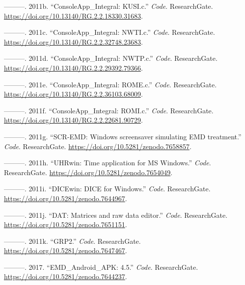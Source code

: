 \documentclass[
]{article}
\newlength{\cslhangindent}
\newlength{\cslentryspacingunit} %
\newenvironment{CSLReferences}[2] %
 {%
  \setlength{\parindent}{0pt}
  \ifodd #1
  \let\oldpar\par
  \def\par{\hangindent=\cslhangindent\oldpar}
  \fi
  \setlength{\parskip}{#2\cslentryspacingunit}
 }%
 {}
\begin{document}
\begin{CSLReferences}{1}{0}
\leavevmode{}%
---------. 2011b. {``{ConsoleApp\_Integral: KUSI.c}.''} \emph{Code}.
ResearchGate. \url{https://doi.org/10.13140/RG.2.2.18330.31683}.

\leavevmode{}%
---------. 2011c. {``{ConsoleApp\_Integral: NWTI.c}.''} \emph{Code}.
ResearchGate. \url{https://doi.org/10.13140/RG.2.2.32748.23683}.

\leavevmode{}%
---------. 2011d. {``{ConsoleApp\_Integral: NWTP.c}.''} \emph{Code}.
ResearchGate. \url{https://doi.org/10.13140/RG.2.2.29392.79366}.

\leavevmode{}%
---------. 2011e. {``{ConsoleApp\_Integral: ROME.c}.''} \emph{Code}.
ResearchGate. \url{https://doi.org/10.13140/RG.2.2.36103.68009}.

\leavevmode{}%
---------. 2011f. {``{ConsoleApp\_Integral: ROMI.c}.''} \emph{Code}.
ResearchGate. \url{https://doi.org/10.13140/RG.2.2.22681.90729}.

\leavevmode{}%
---------. 2011g. {``{SCR-EMD: Windows screensaver simulating EMD
treatment}.''} \emph{Code}. ResearchGate.
\url{https://doi.org/10.5281/zenodo.7658857}.

\leavevmode{}%
---------. 2011h. {``{UHRwin: Time application for MS Windows}.''}
\emph{Code}. ResearchGate. \url{https://doi.org/10.5281/zenodo.7654049}.

\leavevmode{}%
---------. 2011i. {``{DICEwin: DICE for Windows}.''} \emph{Code}.
ResearchGate. \url{https://doi.org/10.5281/zenodo.7644967}.

\leavevmode{}%
---------. 2011j. {``{DAT: Matrices and raw data editor}.''}
\emph{Code}. ResearchGate. \url{https://doi.org/10.5281/zenodo.7651151}.

\leavevmode{}%
---------. 2011k. {``{GRP2}.''} \emph{Code}. ResearchGate.
\url{https://doi.org/10.5281/zenodo.7647467}.

\leavevmode{}%
---------. 2017. {``{EMD\_Android\_APK: 4.5}.''} \emph{Code}.
ResearchGate. \url{https://doi.org/10.5281/zenodo.7644237}.


\end{CSLReferences}
\end{document}
